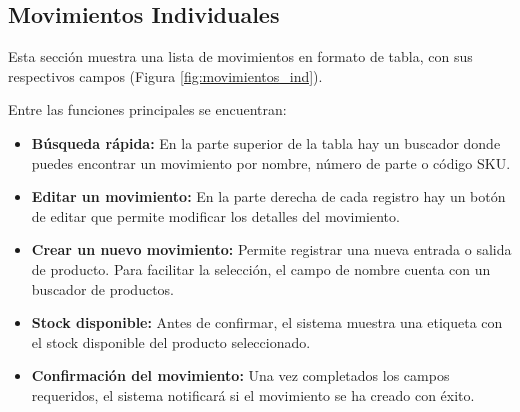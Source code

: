 


\subsection{Movimientos Individuales}
\begin{justify}
    Esta sección muestra una lista de movimientos en formato de tabla, con sus respectivos campos (Figura \ref{fig:movimientos_ind}). 

Entre las funciones principales se encuentran:
\end{justify}
\begin{itemize}
    \item \textbf{Búsqueda rápida:} En la parte superior de la tabla hay un buscador donde puedes encontrar un movimiento por nombre, número de parte o código SKU.
    \item \textbf{Editar un movimiento:} En la parte derecha de cada registro hay un botón de editar que permite modificar los detalles del movimiento.
    \item \textbf{Crear un nuevo movimiento:} Permite registrar una nueva entrada o salida de producto. Para facilitar la selección, el campo de nombre cuenta con un buscador de productos.
    \item \textbf{Stock disponible:} Antes de confirmar, el sistema muestra una etiqueta con el stock disponible del producto seleccionado.
    \item \textbf{Confirmación del movimiento:} Una vez completados los campos requeridos, el sistema notificará si el movimiento se ha creado con éxito.
\end{itemize}

